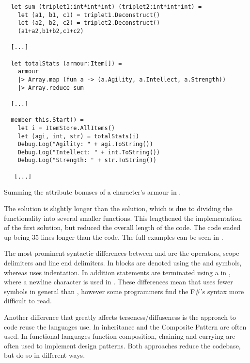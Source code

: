 \begin{listing}[H]
  \begin{verbatim}
  let sum (triplet1:int*int*int) (triplet2:int*int*int) =
    let (a1, b1, c1) = triplet1.Deconstruct()
    let (a2, b2, c2) = triplet2.Deconstruct()
    (a1+a2,b1+b2,c1+c2)
  
  [...]
  
  let totalStats (armour:Item[]) =
    armour
    |> Array.map (fun a -> (a.Agility, a.Intellect, a.Strength))
    |> Array.reduce sum
  
  [...]
  
  member this.Start() =
    let i = ItemStore.AllItems()
    let (agi, int, str) = totalStats(i)
    Debug.Log("Agility: " + agi.ToString())
    Debug.Log("Intellect: " + int.ToString())
    Debug.Log("Strength: " + str.ToString())
  
   [...]
  \end{verbatim}
  \caption{Summing the attribute bonuses of a character's armour in \fs.}
  \label{lst:fs-armour}
  \end{listing}

The \fs solution is slightly longer than the \cs solution, which is due to dividing the functionality into several smaller functions. This lengthened the implementation of the first solution, but reduced the overall length of the code. The \cs code ended up being 35 lines longer than the \fs code. The full examples can be seen in .

The most prominent syntactic differences between \cs and \fs are the operators, scope delimiters and line end delimiters. In \cs blocks are denoted using the \m{\{} and \m{\}} symbols, whereas \fs uses indentation. In addition statements are terminated using a \m{;} in \cs, where a newline character is used in \fs. These differences mean that \fs uses fewer symbols in general than \cs, however some programmers find the F\#'s syntax more difficult to read\cite{fsharp:light:love}.

Another difference that greatly affects terseness/diffuseness is the approach to code reuse the languages use. In \cs inheritance and the Composite Pattern\cite{composite:pattern} are often used\cite{csharp:composite:pattern}. In functional languages function composition, chaining and currying are often used to implement design patterns\cite{functional:design:patterns}. Both approaches reduce the codebase, but do so in different ways.
